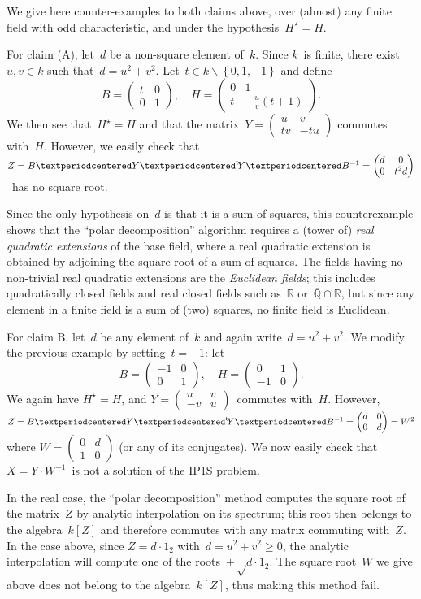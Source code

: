 \documentclass{lms}
\def\transpose#1{{\vphantom{#1}}^{\mathrm{t}}\!#1}
\def\acco#1{\left\{#1\right\}}
\def\mat#1{\begin{pmatrix}#1\end{pmatrix}}
\begin{document}
\medskip
We give here counter-examples to both claims above,
over (almost) any finite field with odd characteristic,
and under the hypothesis~$H^{⋆} = H$.

For claim (A), let~$d$ be a non-square element of~$k$.
Since $k$~is finite, there exist~$u, v ∈ k$ such that~$d = u^2 + v^2$.
Let~$t ∈ k ∖ \acco {0, 1, -1}$ and define
\[ B = \mat{t & 0 \\ 0 & 1}, \quad
H = \mat{0 & 1 \\ t & -\frac{u}{v}(t+1)}. \]
We then see that~$H^{⋆} = H$ and that
the matrix~$Y = \mat{u & v \\ t v & -t u}$ commutes with~$H$.
However, we easily check that
$Z = B · Y · \transpose{Y} · B^{-1} = \mat{d & 0 \\ 0 & t^2 d}$~has no square
root.

Since the only hypothesis on~$d$ is that it is a sum of squares,
this counterexample shows that the ``polar decomposition'' algorithm
requires a (tower of) \emph{real quadratic extensions} of the base field,
where a real quadratic extension is obtained by adjoining
the square root of a sum of squares.
The fields having no non-trivial real quadratic extensions
are the \emph{Euclidean fields};
this includes quadratically closed fields
and real closed fields such as~$ℝ$ or~$\overline{ℚ} ∩ ℝ$,
but since any element in a finite field is a sum of (two) squares,
no finite field is Euclidean.

\medskip

For claim B, let~$d$ be any element of~$k$ and again write~$d = u^2 + v^2$.
We modify the previous example by setting~$t = -1$: let
\[ B = \mat{-1 & 0 \\ 0 & 1}, \quad
H = \mat{0 & 1 \\ -1 & 0}. \]
We again have $H^{⋆} = H$, and $Y = \mat{u & v\\-v & u}$~commutes
with~$H$.
However, $Z = B · Y · \transpose{Y} · B^{-1} = \mat{d & 0 \\ 0 & d} = W^2$
where $W = \mat{0 & d \\ 1 & 0}$ (or any of its conjugates).
We now easily check that
$X = Y · W^{-1}$~is not a solution of the IP1S problem.

In the real case, the ``polar decomposition'' method computes the
square root of the matrix~$Z$ by analytic interpolation on its spectrum;
this root then belongs to the algebra~$k[Z]$
and therefore commutes with any matrix commuting with~$Z$.
In the case above, since $Z = d · 1_{2}$ with~$d = u^2 + v^2 ≥ 0$,
the analytic interpolation will compute one of the roots~$±√{d} · 1_2$.
The square root~$W$ we give above does not belong to the algebra~$k[Z]$,
thus making this method fail.
\end{document}
